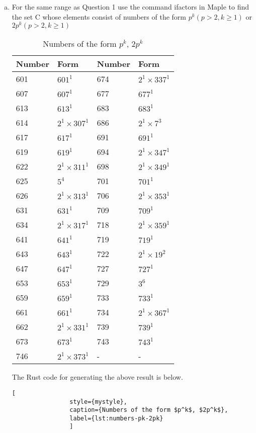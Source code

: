 \documentclass[11pt,a4paper,fleqn]{article}
\begin{document}
\begin{enumerate}[1.]
\begin{enumerate}[a.]
			\item For the same range as Question 1 use the command ifactors in Maple to find the set C whose elements consist of numbers of the form $p^k(p > 2, k \ge 1)$ or $2p^k(p > 2, k \ge 1)$
			\begin{table}[H]
				\centering
				\begin{tabular}{|l|l|l|l|}
					\hline
					Number & Form & Number & Form\\ \hline
					601 & $601^1$ & 674 & $2^1 \times 337^1$  \\ \hline
					607 & $607^1$ & 677 & $677^1$  \\ \hline
					613 & $613^1$ & 683 & $683^1$  \\ \hline
					614 & $2^1 \times 307^1$ & 686 & $2^1 \times 7^3$  \\ \hline
					617 & $617^1$ & 691 & $691^1$  \\ \hline
					619 & $619^1$ & 694 & $2^1 \times 347^1$  \\ \hline
					622 & $2^1 \times 311^1$ & 698 & $2^1 \times 349^1$  \\ \hline
					625 & $5^4$ & 701 & $701^1$  \\ \hline
					626 & $2^1 \times 313^1$ & 706 & $2^1 \times 353^1$  \\ \hline
					631 & $631^1$ & 709 & $709^1$  \\ \hline
					634 & $2^1 \times 317^1$ & 718 & $2^1 \times 359^1$  \\ \hline
					641 & $641^1$ & 719 & $719^1$  \\ \hline
					643 & $643^1$ & 722 & $2^1 \times 19^2$  \\ \hline
					647 & $647^1$ & 727 & $727^1$  \\ \hline
					653 & $653^1$ & 729 & $3^6$  \\ \hline
					659 & $659^1$ & 733 & $733^1$  \\ \hline
					661 & $661^1$ & 734 & $2^1 \times 367^1$  \\ \hline
					662 & $2^1 \times 331^1$ & 739 & $739^1$  \\ \hline
					673 & $673^1$ & 743 & $743^1$  \\ \hline
					746 & $2^1 \times 373^1$ & - & - \\ \hline
				\end{tabular}
				\caption{Numbers of the form $p^k$, $2p^k$}
				\label{table:number_pk_2pk}
			\end{table}

            The Rust code for generating the above result is below.
            \begin{lstlisting}[
                style={mystyle},
                caption={Numbers of the form $p^k$, $2p^k$},
                label={lst:numbers-pk-2pk}
                ]


\end{lstlisting}
\end{enumerate}
\end{enumerate}
\end{document}

